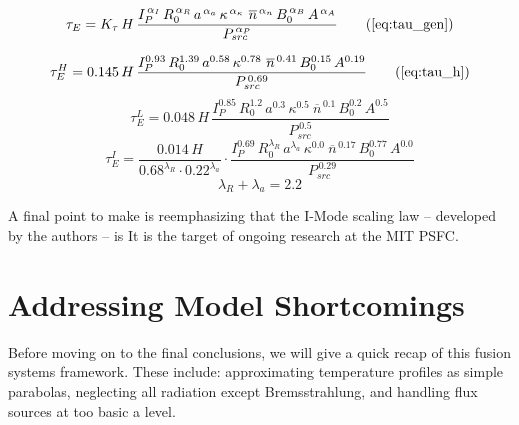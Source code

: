 \begin{equation}
  \tau_E = K_\tau \, H \, \frac{
    I_P^{\,\alpha_I} \, R_0^{\,\alpha_R} \, a^{\,\alpha_a} \, \kappa^{\,\alpha_\kappa} \ \overline{n}^{\,\alpha_n} \, B_0^{\,\alpha_B} \, A^{\,\alpha_A}
  }{ P_{src} ^ {\,\alpha_P} }
  \tag{\ref{eq:tau_gen}}
\end{equation}

\begin{equation}
  \tau_E^H = 0.145 \, H \, \frac{
    I_P^{0.93} \, R_0^{1.39} \, a^{0.58} \, \kappa^{0.78} \ \overline{n}^{\, 0.41} \, B_0^{0.15} \, A^{0.19}
  }{ P_{src} ^ {\,0.69} }
  \tag{\ref{eq:tau_h}}
\end{equation}
\begin{equation}
  \tau_E^L = 0.048\, H \, \frac{
    I_P^{0.85} \, R_0^{1.2} \, a^{0.3} \, \kappa^{0.5} \ \overline{n}^{\, 0.1} \, B_0^{0.2} \, A^{0.5} }{ P_{src} ^ {\,0.5} }
\end{equation}
\begin{equation}
  \tau_E^I = \frac{ 0.014 \, H }{ 0.68 ^ {\lambda_R} \cdot 0.22 ^ {\lambda_a} } \cdot \frac{ I_P^{0.69} \, R_0^{\lambda_R} \, a^{\lambda_a} \, \kappa^{0.0} \ \overline{n}^{\, 0.17} \, B_0^{0.77} \, A^{0.0} }{ P_{src} ^ {\,0.29} }
\end{equation}
\begin{equation}
	\lambda_R + \lambda_a = 2.2
\end{equation}

A final point to make is reemphasizing that the I-Mode scaling law -- developed by the authors -- is  It is the target of ongoing research at the MIT PSFC.\cite{imode}

\section{Addressing Model Shortcomings}

Before moving on to the final conclusions, we will give a quick recap of  this fusion systems framework. These include: approximating temperature profiles as simple parabolas, neglecting all radiation except Bremsstrahlung, and handling flux sources at too basic a level. 

